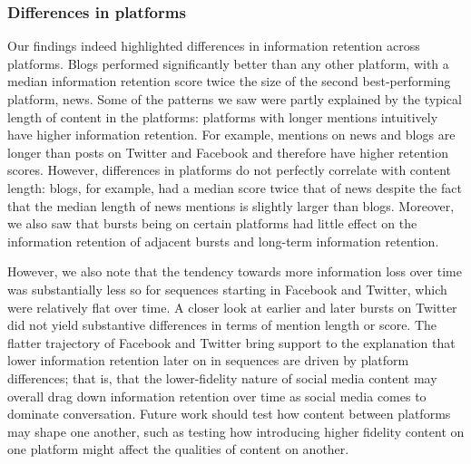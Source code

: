 \documentclass[letterpaper]{article} %
\begin{document}
\subsubsection{Differences in platforms}
Our findings indeed highlighted differences in information retention across platforms. Blogs performed significantly better than any other platform, with a median information retention score twice the size of the second best-performing platform, news. Some of the patterns we saw were partly explained by the typical length of content in the platforms: platforms with longer mentions intuitively have higher information retention. For example, mentions on news and blogs are longer than posts on Twitter and Facebook and therefore have higher retention scores. However, differences in platforms do not perfectly correlate with content length: blogs, for example, had a median score twice that of news despite the fact that the median length of news mentions is slightly larger than blogs. Moreover, we also saw that bursts being on certain platforms had little effect on the information retention of adjacent bursts and long-term information retention.

However, we also note that the tendency towards more information loss over time was substantially less so for sequences starting in Facebook and Twitter, which were relatively flat over time. A closer look at earlier and later bursts on Twitter did not yield substantive differences in terms of mention length or score. The flatter trajectory of Facebook and Twitter bring support to the explanation that lower information retention later on in sequences are driven by platform differences; that is, that the lower-fidelity nature of social media content may overall drag down information retention over time as social media comes to dominate conversation. Future work should test how content between platforms may shape one another, such as testing how introducing higher fidelity content on one platform might affect the qualities of content on another.
\end{document}
